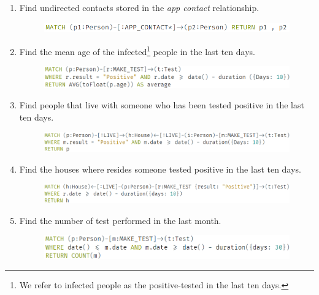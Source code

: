 \begin{enumerate}[leftmargin=*,label=\textbf{\thesection.\arabic*}]
    \item Find undirected contacts stored in the \textit{app contact} relationship.
    \begin{figure}[h]
        \centering
        \includegraphics[width=\textwidth]{images/find_indirected_app_contacts.png}
    \end{figure} 
    \item Find the mean age of the infected\footnote{We refer to infected people as the positive-tested in the last ten days.} people in the last ten days.
    \begin{figure}[h]
        \centering
        \includegraphics[width=\textwidth]{images/avg_positive_age.png}
    \end{figure} 
    \item Find people that live with someone who has been tested positive in the last ten days.
    \begin{figure}[h]
        \centering
        \includegraphics[width=\textwidth]{images/mates_of_positives.png}
    \end{figure} 
\item Find the houses where resides someone tested positive in the last ten days.
    \begin{figure}[!htb]
        \centering
        \includegraphics[width=\textwidth]{images/homes_with_positive.png}
    \end{figure}
\newpage
    \item Find the number of test performed in the last month.
    \begin{figure}[h]
        \centering
        \includegraphics[width=\textwidth]{images/tests_last_30_days.png}

\end{figure}
\end{enumerate}
